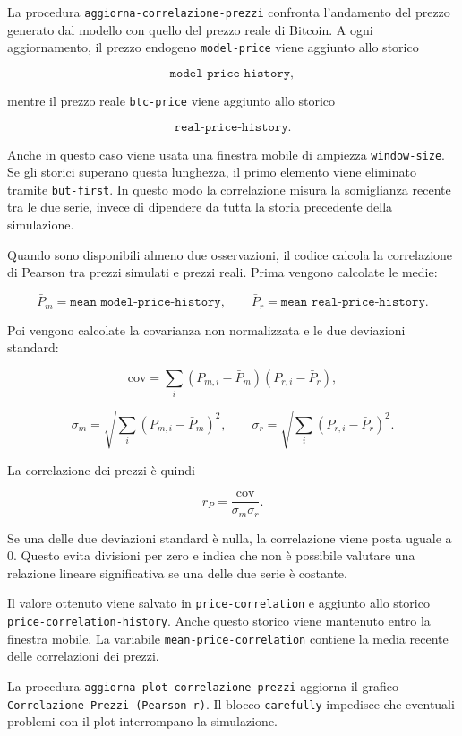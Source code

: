 La procedura \texttt{aggiorna-correlazione-prezzi} confronta l'andamento del
prezzo generato dal modello con quello del prezzo reale di Bitcoin. A ogni
aggiornamento, il prezzo endogeno \texttt{model-price} viene aggiunto allo storico

\[
\texttt{model-price-history},
\]

mentre il prezzo reale \texttt{btc-price} viene aggiunto allo storico

\[
\texttt{real-price-history}.
\]

Anche in questo caso viene usata una finestra mobile di ampiezza
\texttt{window-size}. Se gli storici superano questa lunghezza, il primo elemento
viene eliminato tramite \texttt{but-first}. In questo modo la correlazione misura
la somiglianza recente tra le due serie, invece di dipendere da tutta la storia
precedente della simulazione.

Quando sono disponibili almeno due osservazioni, il codice calcola la
correlazione di Pearson tra prezzi simulati e prezzi reali. Prima vengono
calcolate le medie:

\[
\bar{P}_m = \texttt{mean model-price-history},
\qquad
\bar{P}_r = \texttt{mean real-price-history}.
\]

Poi vengono calcolate la covarianza non normalizzata e le due deviazioni standard:

\[
\text{cov}
=
\sum_i
(P_{m,i}-\bar{P}_m)
(P_{r,i}-\bar{P}_r),
\]

\[
\sigma_m =
\sqrt{
\sum_i
(P_{m,i}-\bar{P}_m)^2
},
\qquad
\sigma_r =
\sqrt{
\sum_i
(P_{r,i}-\bar{P}_r)^2
}.
\]

La correlazione dei prezzi è quindi

\[
r_P =
\frac{\text{cov}}{\sigma_m\sigma_r}.
\]

Se una delle due deviazioni standard è nulla, la correlazione viene posta uguale
a \(0\). Questo evita divisioni per zero e indica che non è possibile valutare
una relazione lineare significativa se una delle due serie è costante.

Il valore ottenuto viene salvato in \texttt{price-correlation} e aggiunto allo
storico \texttt{price-correlation-history}. Anche questo storico viene mantenuto
entro la finestra mobile. La variabile \texttt{mean-price-correlation} contiene
la media recente delle correlazioni dei prezzi.

La procedura \texttt{aggiorna-plot-correlazione-prezzi} aggiorna il grafico
\texttt{Correlazione Prezzi (Pearson r)}. Il blocco \texttt{carefully} impedisce
che eventuali problemi con il plot interrompano la simulazione.

